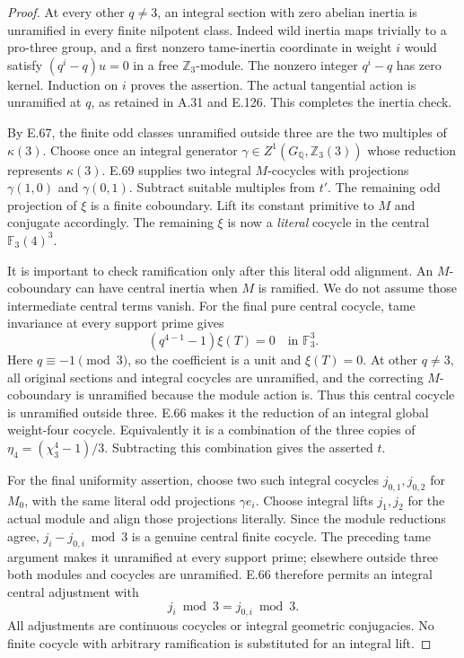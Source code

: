 \begin{proof}
At every other \(q\ne3\), an integral section with
zero abelian inertia is unramified in every finite
nilpotent class. Indeed wild inertia maps trivially
to a pro-three group, and a first nonzero tame-inertia
coordinate in weight \(i\) would satisfy
\((q^i-q)u=0\) in a free \(\mathbb Z_3\)-module.
The nonzero integer \(q^i-q\) has zero kernel.
Induction on \(i\) proves the assertion. The actual
tangential action is unramified at \(q\), as retained
in A.31 and E.126. This completes the inertia check.

By E.67, the finite odd classes unramified outside
three are the two multiples of \(\kappa(3)\).
Choose once an integral generator
\(\gamma\in Z^1(G_{\mathbb Q},\mathbb Z_3(3))\)
whose reduction represents \(\kappa(3)\).
E.69 supplies two integral \(M\)-cocycles with
projections \(\gamma(1,0)\) and \(\gamma(0,1)\).
Subtract suitable multiples from \(t'\). The remaining
odd projection of \(\xi\) is a finite coboundary.
Lift its constant primitive to \(M\) and conjugate
accordingly. The remaining \(\xi\) is now a
\emph{literal} cocycle in the central
\(\mathbb F_3(4)^3\).

It is important to check ramification only after this
literal odd alignment. An \(M\)-coboundary can have
central inertia when \(M\) is ramified. We do not
assume those intermediate central terms vanish.
For the final pure central cocycle, tame invariance
at every support prime gives
\[
                 (q^{4-1}-1)\xi(T)=0
                          \quad\text{in }\mathbb F_3^3.
\]
Here \(q\equiv-1\pmod3\), so the coefficient is a unit
and \(\xi(T)=0\). At other \(q\ne3\), all original
sections and integral cocycles are unramified, and
the correcting \(M\)-coboundary is unramified because
the module action is. Thus this central cocycle is
unramified outside three. E.66 makes it the reduction
of an integral global weight-four cocycle.
Equivalently it is a combination of the three copies
of \(\eta_4=(\chi_3^4-1)/3\). Subtracting this combination
gives the asserted \(t\).

For the final uniformity assertion, choose two such
integral cocycles \(j_{0,1},j_{0,2}\) for \(M_0\), with
the same literal odd projections \(\gamma e_i\).
Choose integral lifts \(j_1,j_2\) for the actual module
and align those projections literally. Since the
module reductions agree, \(j_i-j_{0,i}\bmod3\) is a
genuine central finite cocycle. The preceding tame
argument makes it unramified at every support prime;
elsewhere outside three both modules and cocycles are
unramified. E.66 therefore permits an integral central
adjustment with
\[
                         j_i\bmod3=j_{0,i}\bmod3 .
 \tag{E.130.3}
\]
All adjustments are continuous cocycles or integral
geometric conjugacies. No finite cocycle with arbitrary
ramification is substituted for an integral lift.
\end{proof}

